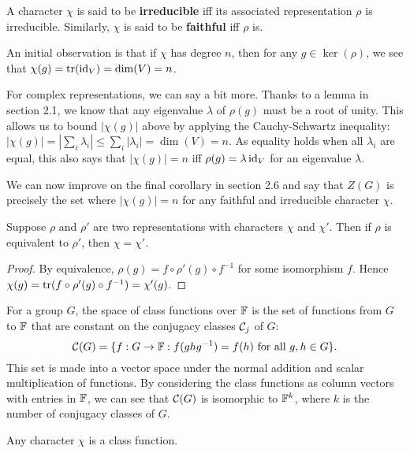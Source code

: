 \documentclass[a4paper]{article}
\begin{document}
\begin{defi}
    A character $\chi$ is said to be \textbf{irreducible} iff its associated representation $\rho$ is irreducible. Similarly, $\chi$ is said to be \textbf{faithful} iff $\rho$ is. 
\end{defi}

An initial observation is that if $\chi$ has degree $n$, then for any $g \in \ker(\rho)$, we see that $\chi(g) = \operatorname{tr}(\operatorname{id}_V) = \dim(V) = n$. 

For complex representations, we can say a bit more. Thanks to a lemma in section 2.1, we know that any eigenvalue $\lambda$ of $\rho(g)$ must be a root of unity. This allows us to bound $|\chi(g)|$ above by applying the Cauchy-Schwartz inequality: $|\chi(g)| = \left| \sum_i \lambda_i \right| \leq \sum_i \left| \lambda_i \right| = \dim(V) = n$. As equality holds when all $\lambda_i$ are equal, this also says that $|\chi(g)| = n$ iff $\rho(g) = \lambda \operatorname{id}_V$ for an eigenvalue $\lambda$. 

We can now improve on the final corollary in section 2.6 and say that $Z(G)$ is precisely the set where $|\chi(g)| = n$ for any faithful and irreducible character $\chi$.

\begin{lemma}
    Suppose $\rho$ and $\rho'$ are two representations with characters $\chi$ and $\chi'$. Then if $\rho$ is equivalent to $\rho'$, then $\chi = \chi'$.
\end{lemma}

\begin{proof}
    By equivalence, $\rho(g) = f \circ \rho'(g) \circ f^{-1}$ for some isomorphism $f$. Hence $\chi(g) = \operatorname{tr}(f \circ \rho'(g) \circ f^{-1}) = \chi'(g)$. 
\end{proof}

\begin{defi}
    For a group $G$, the space of class functions over $\mathbb{F}$ is the set of functions from $G$ to $\mathbb{F}$ that are constant on the conjugacy classes $\mathcal{C}_j$ of $G$: $$\mathcal{C}(G) = \{f : G \to \mathbb{F} : f(ghg^{-1}) = f(h) \text{ for all } g, h \in G\}.$$
    This set is made into a vector space under the normal addition and scalar multiplication of functions. By considering the class functions as column vectors with entries in $\mathbb{F}$, we can see that $\mathcal{C}(G)$ is isomorphic to $\mathbb{F}^k$, where $k$ is the number of conjugacy classes of $G$.
\end{defi}

\begin{lemma}
    Any character $\chi$ is a class function.
\end{lemma}
\end{document}

